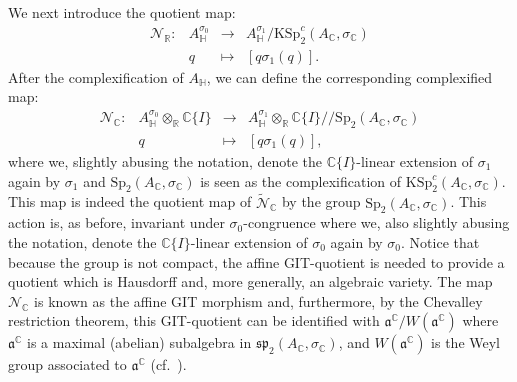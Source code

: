 \documentclass[oneside,11pt]{amsart}
\theoremstyle{definition}
\theoremstyle{remark}
\numberwithin{thm}{section}
\numberwithin{equation}{section}
\begin{document}
We next introduce the quotient map:
\begin{equation}\label{eq:real_norm}
\begin{array}{rccl}
\mathcal N_\mathbb R\colon & A^{\sigma_0}_\mathbb H & \to & A^{\sigma_1}_\mathbb H/\mathrm{KSp}^c_2(A_\mathbb C,\sigma_\mathbb C)\\
& q & \mapsto & [q\sigma_1(q)].
\end{array}    
\end{equation}
After the complexification of $A_\mathbb H$, we can define the corresponding complexified map:
\begin{equation}\label{eq:complex_norm}
\begin{array}{rrcl}
\mathcal N_\mathbb C\colon & A^{\sigma_0}_\mathbb H\otimes_\mathbb R\mathbb C\{I\} & \to & A^{\sigma_1}_\mathbb H\otimes_\mathbb R \mathbb C\{I\}/\!\!/\mathrm{Sp}_2(A_\mathbb C,\sigma_\mathbb C)\\
& q & \mapsto & [q\sigma_1(q)],
\end{array}    
\end{equation}
where we, slightly abusing the notation, denote the $\mathbb C\{I\}$-linear extension of $\sigma_1$ again by $\sigma_1$ and $\mathrm{Sp}_2(A_\mathbb C,\sigma_\mathbb C)$ is seen as the complexification of $\mathrm{KSp}^c_2(A_\mathbb C,\sigma_\mathbb C)$. This map is indeed the quotient map of $\tilde{\mathcal{N}}_\mathbb C$ by the group $\mathrm{Sp}_2(A_\mathbb C,\sigma_\mathbb C)$. This action is, as before, invariant under $\sigma_0$-congruence where we, also slightly abusing the notation, denote the $\mathbb C\{I\}$-linear extension of $\sigma_0$ again by $\sigma_0$. Notice that because the group is not compact, the affine GIT-quotient is needed to provide a quotient which is Hausdorff and, more generally, an algebraic variety. The map $\mathcal N_\mathbb C$ is known as the affine GIT morphism and, furthermore, by the Chevalley restriction theorem, this GIT-quotient can be identified with $\mathfrak{a}^\mathbb C/W(\mathfrak a^\mathbb C)$ where $\mathfrak{a}^\mathbb C$ is a maximal (abelian) subalgebra in $\mathfrak{sp}_2(A_{\mathbb{C}},\sigma_{\mathbb{C}})$, and $W(\mathfrak a^\mathbb C)$ is the Weyl group associated to $\mathfrak a^\mathbb C$ (cf.~\cite[Section 4]{GPR}). 
\end{document}
